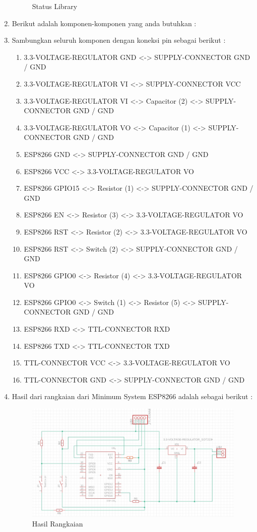 \begin{enumerate}
\begin{figure}[H]
            \caption{Status Library} 
            \label{fig:Status Library}
        \end{figure}
    \item Berikut adalah komponen-komponen yang anda butuhkan :
    \item Sambungkan seluruh komponen dengan koneksi pin sebagai berikut :
        \begin{enumerate}
            \item 3.3-VOLTAGE-REGULATOR GND <-> SUPPLY-CONNECTOR GND / GND
            \item 3.3-VOLTAGE-REGULATOR VI <-> SUPPLY-CONNECTOR VCC
            \item 3.3-VOLTAGE-REGULATOR VI <-> Capacitor (2) <-> SUPPLY-CONNECTOR GND / GND
            \item 3.3-VOLTAGE-REGULATOR VO <-> Capacitor (1) <->  SUPPLY-CONNECTOR GND / GND
            \item ESP8266 GND <->  SUPPLY-CONNECTOR GND / GND
            \item ESP8266 VCC <-> 3.3-VOLTAGE-REGULATOR VO
            \item ESP8266 GPIO15 <-> Resistor (1) <->  SUPPLY-CONNECTOR GND / GND
            \item ESP8266 EN <-> Resistor (3) <-> 3.3-VOLTAGE-REGULATOR VO
            \item ESP8266 RST <-> Resistor (2) <-> 3.3-VOLTAGE-REGULATOR VO
            \item ESP8266 RST <-> Switch (2) <->  SUPPLY-CONNECTOR GND / GND
            \item ESP8266 GPIO0 <-> Resistor (4) <-> 3.3-VOLTAGE-REGULATOR VO
            \item ESP8266 GPIO0 <-> Switch (1) <-> Resistor (5) <->  SUPPLY-CONNECTOR GND / GND
            \item ESP8266 RXD <-> TTL-CONNECTOR RXD
            \item ESP8266 TXD <-> TTL-CONNECTOR TXD
            \item TTL-CONNECTOR VCC <-> 3.3-VOLTAGE-REGULATOR VO
            \item TTL-CONNECTOR GND <->  SUPPLY-CONNECTOR GND / GND
        \end{enumerate}
    \item Hasil dari rangkaian dari Minimum System ESP8266 adalah sebagai berikut :
        \begin{figure}[H]
            \centering
            \includegraphics[width=0.6\linewidth]{P1/img/gambar23.jpeg}
            \caption{Hasil Rangkaian} 
            \label{fig:Hasil Rangkaian}
        \end{figure}


\end{enumerate}
